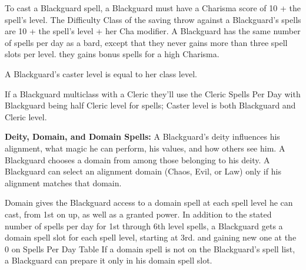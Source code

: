 To cast a Blackguard spell, a Blackguard must have a Charisma score of 10 + the spell's level. The Difficulty Class of the saving throw against a Blackguard's spells are 10 + the spell's level + her Cha modifier. A Blackguard has the same number of spells per day as a bard, except that they never gains more than three spell slots per level. they gains bonus spells for a high Charisma.

A Blackguard's caster level is equal to her class level.

If a Blackguard multiclass with a Cleric they'll use the Cleric Spells Per Day with Blackguard being half Cleric level for spells; Caster level is both Blackguard and Cleric level. 

\textbf{Deity, Domain, and Domain Spells:} A Blackguard's deity influences his alignment, what magic he can perform, his values, and how others see him. A Blackguard chooses a domain from among those belonging to his deity. A Blackguard can select an alignment domain (Chaos, Evil, or Law) only if his alignment matches that domain.

Domain gives the Blackguard access to a domain spell at each spell level he can cast, from 1st on up, as well as a granted power. In addition to the stated number of spells per day for 1st through 6th level spells, a Blackguard gets a domain spell slot for each spell level, starting at 3rd. and gaining  new one at the 0 on Spells Per Day Table If a domain spell is not on the Blackguard's spell list, a Blackguard can prepare it only in his domain spell slot.

